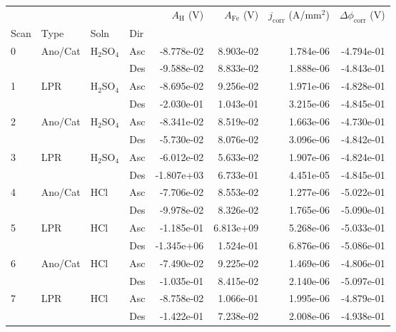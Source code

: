\begin{tabular}{llllrrrr}
\toprule
  &     &     &     &  $A_{\text{H}}$ (V) &  $A_{\text{Fe}}$ (V) &  $j_{\text{corr}}$ (A/mm$^2$) &  $\Delta \phi_{\text{corr}}$ (V) \\
Scan & Type & Soln & Dir &                     &                      &                               &                                  \\
\midrule
0 & Ano/Cat & H$_2$SO$_4$ & Asc &          -8.778e-02 &            8.903e-02 &                     1.784e-06 &                       -4.794e-01 \\
  &     &     & Des &          -9.588e-02 &            8.833e-02 &                     1.888e-06 &                       -4.843e-01 \\
1 & LPR & H$_2$SO$_4$ & Asc &          -8.695e-02 &            9.256e-02 &                     1.971e-06 &                       -4.828e-01 \\
  &     &     & Des &          -2.030e-01 &            1.043e-01 &                     3.215e-06 &                       -4.845e-01 \\
2 & Ano/Cat & H$_2$SO$_4$ & Asc &          -8.341e-02 &            8.519e-02 &                     1.663e-06 &                       -4.730e-01 \\
  &     &     & Des &          -5.730e-02 &            8.076e-02 &                     3.096e-06 &                       -4.842e-01 \\
3 & LPR & H$_2$SO$_4$ & Asc &          -6.012e-02 &            5.633e-02 &                     1.907e-06 &                       -4.824e-01 \\
  &     &     & Des &          -1.807e+03 &            6.733e-01 &                     4.451e-05 &                       -4.845e-01 \\
4 & Ano/Cat & HCl & Asc &          -7.706e-02 &            8.553e-02 &                     1.277e-06 &                       -5.022e-01 \\
  &     &     & Des &          -9.978e-02 &            8.326e-02 &                     1.765e-06 &                       -5.090e-01 \\
5 & LPR & HCl & Asc &          -1.185e-01 &            6.813e+09 &                     5.268e-06 &                       -5.033e-01 \\
  &     &     & Des &          -1.345e+06 &            1.524e-01 &                     6.876e-06 &                       -5.086e-01 \\
6 & Ano/Cat & HCl & Asc &          -7.490e-02 &            9.225e-02 &                     1.469e-06 &                       -4.806e-01 \\
  &     &     & Des &          -1.035e-01 &            8.415e-02 &                     2.140e-06 &                       -5.097e-01 \\
7 & LPR & HCl & Asc &          -8.758e-02 &            1.066e-01 &                     1.995e-06 &                       -4.879e-01 \\
  &     &     & Des &          -1.422e-01 &            7.238e-02 &                     2.008e-06 &                       -4.938e-01 \\
\bottomrule
\end{tabular}
